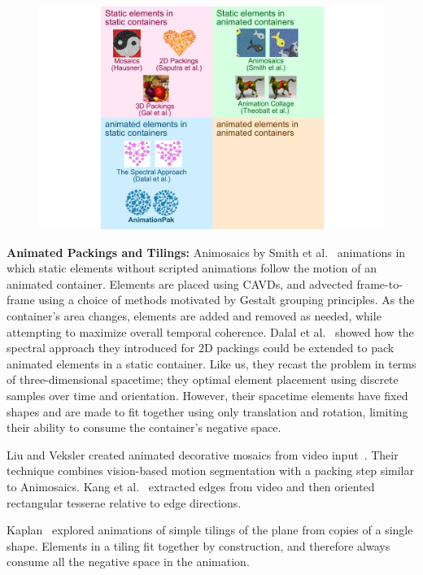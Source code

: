 \begin{figure}[h]
\centering
\includegraphics[width=1.0\textwidth]{figures/animationpak/2x2.pdf} 
\caption[A classification of animated packings]
{\label{fig_animationpak_categorization} 
}
\end{figure}

\textbf{Animated Packings and Tilings:}
Animosaics by Smith et al.~\cite{Smith2005}  animations 
in which static elements without scripted
animations follow the motion of an animated container.  Elements are
placed using CAVDs, and advected frame-to-frame using a choice of methods
motivated by Gestalt grouping principles.
As the container's area changes, elements are added and removed as needed,
while attempting to maximize overall temporal coherence.
Dalal et al.~\cite{Dalal2006} showed how the spectral approach they
introduced for 2D packings could be extended 
to pack animated elements in a static container.  Like us, they recast
the problem in terms of three-dimensional spacetime; they  optimal
element placement using discrete samples over time and orientation.
However, their spacetime elements have fixed
shapes and are made to fit together using only translation and rotation, 
limiting their ability to consume the container's negative space.

Liu and Veksler created animated decorative mosaics from video
input~\cite{Liu2009}.  Their technique combines vision-based
motion segmentation with a packing step similar to Animosaics.
Kang et al.~\cite{Kang2011} extracted edges from video and 
then oriented rectangular tesserae relative to edge directions.

Kaplan~\cite{Kaplan2019} explored animations of simple tilings of
the plane from copies of a single shape.  Elements in a tiling
fit together by construction, and therefore always consume all 
the negative space in the animation.


